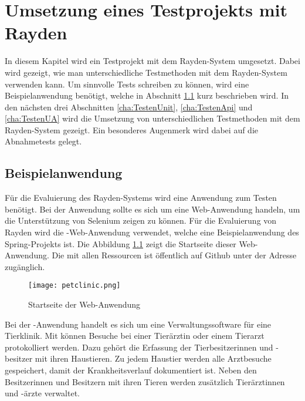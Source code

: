 \chapter{Umsetzung eines Testprojekts mit Rayden}
\label{cha:Testen}

In diesem Kapitel wird ein Testprojekt mit dem Rayden-System umgesetzt. Dabei wird gezeigt, wie man unterschiedliche Testmethoden mit dem Rayden-System verwenden kann. Um sinnvolle Tests schreiben zu können, wird eine Beispielanwendung benötigt, welche in Abschnitt \ref{cha:demoapp} kurz beschrieben wird. In den nächsten drei Abschnitten \ref{cha:TestenUnit}, \ref{cha:TestenApi} und \ref{cha:TestenUA} wird die Umsetzung von unterschiedlichen Testmethoden mit dem Rayden-System gezeigt. Ein besonderes Augenmerk wird dabei auf die Abnahmetests gelegt.


\section{Beispielanwendung }
\label{cha:demoapp}

Für die Evaluierung des Rayden-Systems wird eine Anwendung zum Testen benötigt. Bei der Anwendung sollte es sich um eine Web-Anwendung handeln, um die Unterstützung von Selenium zeigen zu können. Für die Evaluierung von Rayden wird die -Web-Anwendung verwendet, welche eine Beispielanwendung des Spring-Projekts ist. Die Abbildung \ref{fig:petClinicPage} zeigt die Startseite dieser Web-Anwendung. Die  mit allen Ressourcen ist öffentlich auf Github unter der Adresse  zugänglich.

\begin{figure}
\centering
\texttt{[image: petclinic.png]}
\caption{Startseite der Web-Anwendung }
\label{fig:petClinicPage}
\end{figure}

\SuperPar
Bei der -Anwendung handelt es sich um eine Verwaltungssoftware für eine Tierklinik. Mit  können Besuche bei einer Tierärztin oder einem Tierarzt protokolliert werden. Dazu gehört die Erfassung der Tierbesitzerinnen und -besitzer mit ihren Haustieren. Zu jedem Haustier werden alle Arztbesuche gespeichert, damit der Krankheitsverlauf dokumentiert ist. Neben den Besitzerinnen und Besitzern mit ihren Tieren werden zusätzlich Tierärztinnen und -ärzte verwaltet. 

